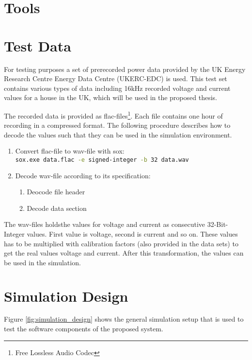 \section{Tools}

\section{Test Data}
For testing purposes a set of prerecorded power data provided by the UK Energy Research Centre Energy Data Centre (UKERC-EDC) is used\cite{ukerc}.
This test set contains various types of data including 16kHz recorded voltage and current values for a house in the UK, which will be used in the proposed thesis.

The recorded data is provided as flac-files\footnote{Free Lossless Audio Codec\cite{flac}}. Each file contains one hour of recording in a compressed format. The following procedure describes how to decode the values such that they can be used in the simulation environment.

\begin{enumerate}
	\item Convert flac-file to wav-file with sox\cite{sox}: \\ \lstinline[language=bash,basicstyle=\ttfamily]{sox.exe data.flac -e signed-integer -b 32 data.wav}
	\item Decode wav-file according to its specification\cite{wav}:
	\begin{enumerate}
		\item Deocode file header
		\item Decode data section
	\end{enumerate}
\end{enumerate}

The wav-files holdsthe values for voltage and current as consecutive 32-Bit-Integer values. First value is voltage, second is current and so on. These values has to be multiplied with calibration factors (also provided in the data sets) to get the real values voltage and current. After this transformation, the values can be used in the simulation.

\section{Simulation Design}

Figure \ref{fig:simulation_design} shows the general simulation setup that is used to test the software components of the proposed system.

